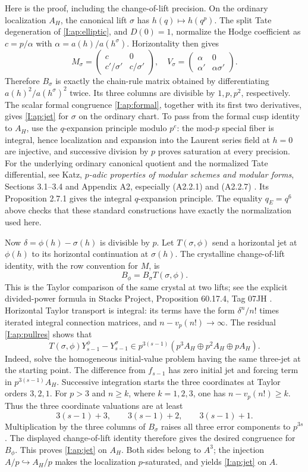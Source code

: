 \documentclass[11pt,letterpaper]{article}
\theoremstyle{definition}
\theoremstyle{remark}
\begin{document}
Here is the proof, including the change-of-lift precision.
On the ordinary localization $A_H$, the canonical lift $\sigma$ has
$h(q)\mapsto h(q^p)$. The split Tate degeneration of
\eqref{I:ap:elliptic}, and $D(0)=1$, normalize the Hodge coefficient as
$c=p/\alpha$ with $\alpha=a(h)/a(h^\sigma)$. Horizontality then gives
\[
 M_\sigma=\begin{pmatrix}c&0\\c'/\sigma'&c/\sigma'\end{pmatrix},
 \quad V_\sigma=\begin{pmatrix}\alpha&0\\\alpha'&\alpha\sigma'\end{pmatrix}.
\]
Therefore $B_\sigma$ is exactly the chain-rule matrix obtained by
differentiating $a(h)^2/a(h^\sigma)^2$ twice. Its three columns are
divisible by $1,p,p^2$, respectively. The scalar formal congruence
\eqref{I:ap:formal}, together with its first two derivatives, gives
\eqref{I:ap:jet} for $\sigma$ on the ordinary chart. To pass from the
formal cusp identity to $A_H$, use the $q$-expansion principle modulo
$p^e$: the mod-$p$ special fiber is integral, hence localization and
expansion into the Laurent series field at $h=0$ are injective, and
successive division by $p$ proves saturation at every precision.
For the underlying ordinary canonical quotient and the normalized
Tate differential, see Katz, \emph{$p$-adic properties of modular
schemes and modular forms}, Sections 3.1--3.4 and Appendix A2,
especially (A2.2.1) and (A2.2.7) \cite{I:Katz}. Its Proposition 2.7.1 gives the
integral $q$-expansion principle. The equality $q_E=q^6$ above checks
that these standard constructions have exactly the normalization
used here.

Now $\delta=\phi(h)-\sigma(h)$ is divisible by $p$. Let
$T(\sigma,\phi)$ send a horizontal jet at $\phi(h)$ to its horizontal
continuation at $\sigma(h)$. The crystalline change-of-lift identity,
with the row convention for $M$, is
\[
 B_\phi=B_\sigma T(\sigma,\phi).
\]
This is the Taylor comparison of the same crystal at two lifts; see
the explicit divided-power formula in Stacks Project,
Proposition 60.17.4, Tag 07JH \cite{I:Stacks}.
Horizontal Taylor transport is integral: its terms have the form
$\delta^n/n!$ times iterated integral connection matrices, and
$n-v_p(n!)\to\infty$. The residual \eqref{I:ap:pullres} shows that
\[
 T(\sigma,\phi)Y_{s-1}^\phi-Y_{s-1}^\sigma
 \in p^{3(s-1)}\left(p^3A_H\oplus p^2A_H\oplus pA_H\right).
\]
Indeed, solve the homogeneous initial-value problem having the same
three-jet at the starting point. The difference from $f_{s-1}$ has
zero initial jet and forcing term in $p^{3(s-1)}A_H$. Successive
integration starts the three coordinates at Taylor orders $3,2,1$.
For $p>3$ and $n\geq k$, where $k=1,2,3$, one has
$n-v_p(n!)\geq k$. Thus the three coordinate valuations are at least
\[
 3(s-1)+3,\qquad3(s-1)+2,\qquad3(s-1)+1.
\]
Multiplication by the three columns of $B_\sigma$ raises all three
error components to $p^{3s}$. The displayed change-of-lift identity
therefore gives the desired congruence for $B_\phi$.
This proves \eqref{I:ap:jet} on $A_H$. Both sides belong to $A^3$;
the injection $A/p\hookrightarrow A_H/p$ makes the localization
$p$-saturated, and yields \eqref{I:ap:jet} on $A$.
\end{document}
